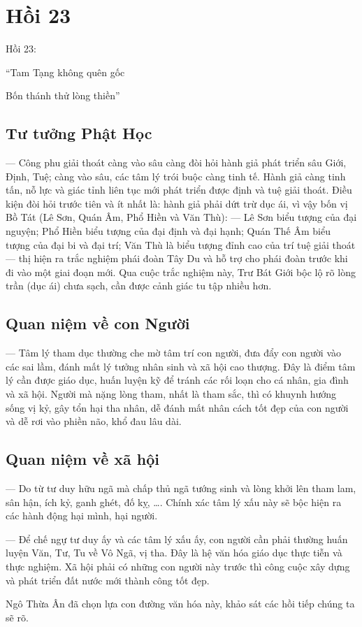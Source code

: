 \chapter{Hồi 23} %
\label{cha:hoi_23}

Hồi 23:

\begin{itshape}
``Tam Tạng không quên gốc

Bốn thánh thử lòng thiền''
\end{itshape}

\section{Tư tưởng Phật Học} %
\label{sec:23_phat_hoc}

— Công phu giải thoát càng vào sâu càng đòi hỏi hành giả phát triển sâu Giới, Định, Tuệ; càng vào sâu, các tâm lý trói buộc càng tinh tế. Hành giả càng tinh tấn, nỗ lực và giác tỉnh liên tục mới phát triển được định và tuệ giải thoát. Điều kiện đòi hỏi trước tiên và ít nhất là: hành giả phải dứt trừ dục ái, vì vậy bốn vị Bồ Tát (Lê Sơn, Quán Âm, Phổ Hiền và Văn Thù): — Lê Sơn biểu tượng của đại nguyện; Phổ Hiền biểu tượng của đại định và đại hạnh; Quán Thế Âm biểu tượng của đại bi và đại trí; Văn Thù là biểu tượng đỉnh cao của trí tuệ giải thoát — thị hiện ra trắc nghiệm phái đoàn Tây Du và hỗ trợ cho phái đoàn trước khi đi vào một giai đoạn mới. Qua cuộc trắc nghiệm này, Trư Bát Giới bộc lộ rõ lòng trần (dục ái) chưa sạch, cần được cảnh giác tu tập nhiều hơn.

\section{Quan niệm về con Người} %
\label{sec:23_con_nguoi}

— Tâm lý tham dục thường che mờ tâm trí con người, đưa đẩy con người vào các sai lầm, đánh mất lý tưởng nhân sinh và xã hội cao thượng. Đây là điểm tâm lý cần được giáo dục, huấn luyện kỹ để tránh các rối loạn cho cá nhân, gia đình và xã hội. Người mà nặng lòng tham, nhất là tham sắc, thì có khuynh hướng sống vị kỷ, gây tổn hại tha nhân, dễ đánh mất nhân cách tốt đẹp của con người và dễ rơi vào phiền não, khổ đau lâu dài.

\section{Quan niệm về xã hội} %
\label{sec:23_xa_hoi}

— Do từ tư duy hữu ngã mà chấp thủ ngã tướng sinh và lòng khởi lên tham lam, sân hận, ích kỷ, ganh ghét, đố kỵ, \ldots. Chính xác tâm lý xấu này sẽ bộc hiện ra các hành động hại mình, hại người.

— Để chế ngự tư duy ấy và các tâm lý xấu ấy, con người cần phải thường huấn luyện Văn, Tư, Tu về Vô Ngã, vị tha. Đây là hệ văn hóa giáo dục thực tiễn và thực nghiệm. Xã hội phải có những con người này trước thì công cuộc xây dựng và phát triển đất nước mới thành công tốt đẹp.

Ngô Thừa Ân đã chọn lựa con đường văn hóa này, khảo sát các hồi tiếp chúng ta sẽ rõ.
